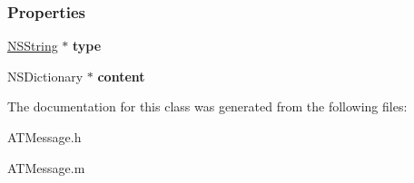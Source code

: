 \subsubsection*{Properties}
\begin{DoxyCompactItemize}
\item 
\hypertarget{interface_a_t_message_ae76aa0e54d3ec8380ba8b7d8fbcf7d9f}{
\hyperlink{class_n_s_string}{NSString} $\ast$ {\bfseries type}}
\label{interface_a_t_message_ae76aa0e54d3ec8380ba8b7d8fbcf7d9f}

\item 
\hypertarget{interface_a_t_message_a42e10d45f4235440c77a217bd6fcb2a8}{
NSDictionary $\ast$ {\bfseries content}}
\label{interface_a_t_message_a42e10d45f4235440c77a217bd6fcb2a8}

\end{DoxyCompactItemize}


The documentation for this class was generated from the following files:\begin{DoxyCompactItemize}
\item 
ATMessage.h\item 
ATMessage.m\end{DoxyCompactItemize}
